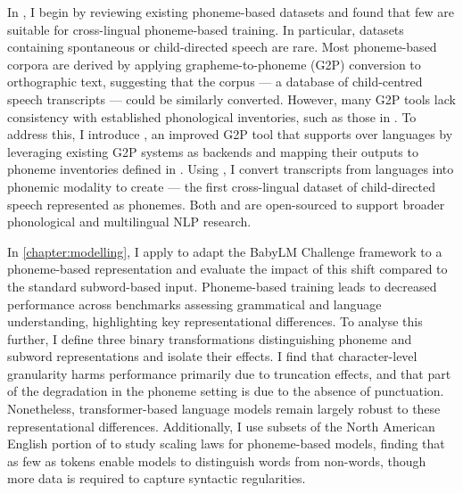 In , I begin by reviewing existing phoneme-based datasets and found that few are suitable for cross-lingual phoneme-based training. In particular, datasets containing spontaneous or child-directed speech are rare. Most phoneme-based corpora are derived by applying grapheme-to-phoneme (G2P) conversion to orthographic text, suggesting that the \childes corpus --- a database of child-centred speech transcripts --- could be similarly converted. However, many G2P tools lack consistency with established phonological inventories, such as those in \phoible. To address this, I introduce \gpp, an improved G2P tool that supports over  languages by leveraging existing G2P systems as backends and mapping their outputs to phoneme inventories defined in \phoible. Using \gpp, I convert transcripts from  \childes languages into phonemic modality to create \ipachildes --- the first cross-lingual dataset of child-directed speech represented as phonemes. Both \gpp and \ipachildes are open-sourced to support broader phonological and multilingual NLP research.

In \cref{chapter:modelling}, I apply \gpp to adapt the BabyLM Challenge framework to a phoneme-based representation and evaluate the impact of this shift compared to the standard subword-based input. Phoneme-based training leads to decreased performance across benchmarks assessing grammatical and language understanding, highlighting key representational differences. To analyse this further, I define three binary transformations distinguishing phoneme and subword representations and isolate their effects. I find that character-level granularity harms performance primarily due to truncation effects, and that part of the degradation in the phoneme setting is due to the absence of punctuation. Nonetheless, transformer-based language models remain largely robust to these representational differences. Additionally, I use subsets of the North American English portion of \ipachildes to study scaling laws for phoneme-based models, finding that as few as  tokens enable models to distinguish words from non-words, though more data is required to capture syntactic regularities.

